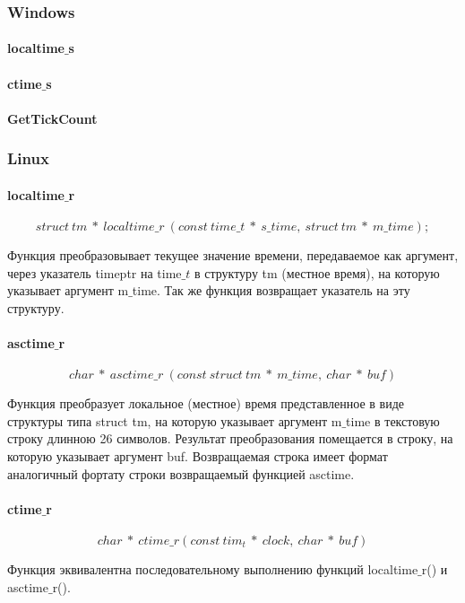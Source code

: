 \documentclass{article}
\begin{document}
			
		\subsubsection{Windows}	
			\paragraph*{localtime$\_$s}	
			\paragraph*{ctime$\_$s}				
			\paragraph*{GetTickCount}
		\subsubsection{Linux}	
			\paragraph*{localtime$\_$r}
			$$struct~tm~*~localtime\_r~(const~time\_t~*~s\_time,~struct~tm~*~m\_time);$$
			
				Функция преобразовывает текущее значение времени, передаваемое как аргумент, через указатель timeptr на time$\_t$ 			в структуру tm (местное время), на которую указывает аргумент m$\_$time. Так же функция возвращает указатель на эту 				структуру.	
			
			\paragraph*{asctime$\_$r}			
			$$char~*~asctime\_r~(const~struct~tm~*~m\_time,~char~*~buf)$$			
			
				Функция преобразует локальное (местное) время представленное в виде структуры типа struct tm, на которую 						указывает аргумент m$\_$time в текстовую строку длинною 26 символов. Результат преобразования помещается в строку, на 			которую указывает аргумент buf. Возвращаемая строка имеет формат аналогичный фортату строки возвращаемый функцией 					asctime.
				
			\paragraph*{ctime$\_$r}				
				$$char~*~ctime\_r(const~tim_t~*~clock,~char~*~buf)$$

				Функция эквивалентна последовательному выполнению функций localtime$\_$r() и asctime$\_$r().
			
\end{document}
